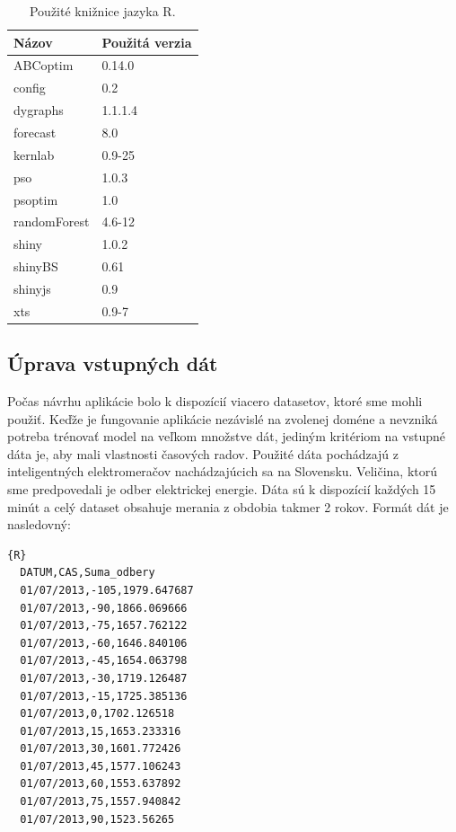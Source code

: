 \documentclass[a4paper,slovak,12pt,appendix]{article}
\begin{document}
\begin{table}[ht]
  \centering
  \caption{Použité knižnice jazyka R.}
  \label{tab-libraries}
  \begin{tabular}{|l|l|}
    \hline
    \textbf{Názov}  &   \textbf{Použitá verzia}  \\ \hline
    ABCoptim        &   0.14.0  \\ \hline
    config          &   0.2     \\ \hline
		dygraphs        &   1.1.1.4 \\ \hline
    forecast        &   8.0     \\ \hline
    kernlab         &   0.9-25  \\ \hline
    pso             &   1.0.3   \\ \hline
    psoptim         &   1.0     \\ \hline
    randomForest    &   4.6-12  \\ \hline
    shiny           &   1.0.2   \\ \hline
		shinyBS         &   0.61    \\ \hline
    shinyjs         &   0.9     \\ \hline
		xts         		&   0.9-7   \\ \hline
  \end{tabular}
\end{table}


\subsection{Úprava vstupných dát}
Počas návrhu aplikácie bolo k dispozícií viacero datasetov, ktoré sme mohli
použiť. Keďže je fungovanie aplikácie nezávislé na zvolenej doméne a nevzniká
potreba trénovať model na veľkom množstve dát, jediným kritériom na vstupné
dáta je, aby mali vlastnosti časových radov. Použité dáta pochádzajú
z inteligentných elektromeračov nachádzajúcich sa na Slovensku. Veličina, ktorú
sme predpovedali je odber elektrickej energie. Dáta sú k dispozícií každých
15 minút a celý dataset obsahuje merania z obdobia takmer 2 rokov. Formát
dát je nasledovný:

\begin{lstlisting}{R}
  DATUM,CAS,Suma_odbery
  01/07/2013,-105,1979.647687
  01/07/2013,-90,1866.069666
  01/07/2013,-75,1657.762122
  01/07/2013,-60,1646.840106
  01/07/2013,-45,1654.063798
  01/07/2013,-30,1719.126487
  01/07/2013,-15,1725.385136
  01/07/2013,0,1702.126518
  01/07/2013,15,1653.233316
  01/07/2013,30,1601.772426
  01/07/2013,45,1577.106243
  01/07/2013,60,1553.637892
  01/07/2013,75,1557.940842
  01/07/2013,90,1523.56265
\end{lstlisting}
\end{document}
